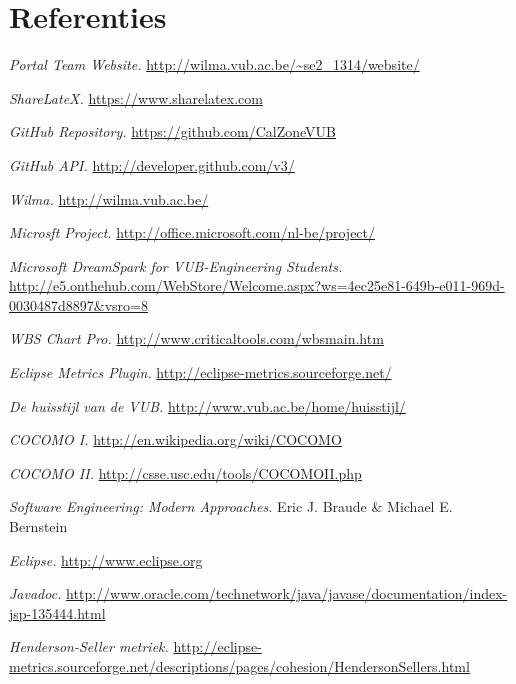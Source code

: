 \chapter{Referenties}
\begingroup
\renewcommand{\chapter}[2]{}%
\begin{thebibliography}{99}

     \emph{Portal Team Website.} \url{http://wilma.vub.ac.be/~se2_1314/website/}
    
     \emph{ShareLateX.} \url{https://www.sharelatex.com}
    
     \emph{GitHub Repository.} \url{https://github.com/CalZoneVUB}
    
     \emph{GitHub API.} \url{http://developer.github.com/v3/}
    
     \emph{Wilma.} \url{http://wilma.vub.ac.be/}
    
     \emph{Microsft Project.} \url{http://office.microsoft.com/nl-be/project/}
    
     \emph{Microsoft DreamSpark for VUB-Engineering Students.} \url{http://e5.onthehub.com/WebStore/Welcome.aspx?ws=4ec25e81-649b-e011-969d-0030487d8897&vsro=8}
    
     \emph{WBS Chart Pro.} \url{http://www.criticaltools.com/wbsmain.htm}
    
     \emph{Eclipse Metrics Plugin.} \url{http://eclipse-metrics.sourceforge.net/}
    
     \emph{De huisstijl van de VUB.} \url{http://www.vub.ac.be/home/huisstijl/}

	 \emph{COCOMO I.} \url{http://en.wikipedia.org/wiki/COCOMO}
	
	 \emph{COCOMO II.} \url{http://csse.usc.edu/tools/COCOMOII.php}
	
	 \emph{Software Engineering: Modern Approaches.} Eric J. Braude \& Michael E. Bernstein

     \emph{Eclipse.} \url{http://www.eclipse.org}
    
     \emph{Javadoc.} \url{http://www.oracle.com/technetwork/java/javase/documentation/index-jsp-135444.html}

		 \emph{Henderson-Seller metriek.} \url{http://eclipse-metrics.sourceforge.net/descriptions/pages/cohesion/HendersonSellers.html}





\end{thebibliography}


\endgroup